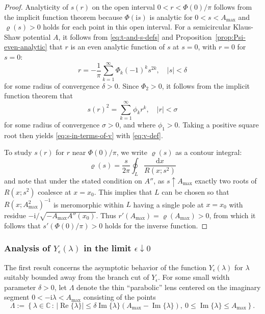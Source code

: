 \documentclass[12pt]{amsart}
\numberwithin{equation}{section}
\newcommand{\dd}{\mathrm{d}}
\newcommand{\ii}{\mathrm{i}}
\newcommand{\SP}{\lambda}
\newcommand{\phaseint}{\Phi}
\newcommand{\evdensity}{\varrho}
\newcommand{\C}{\mathbb{C}}
\newcommand{\rr}{r}
\DeclareMathOperator{\imag}{Im}
\DeclareMathOperator{\re}{Re}
\begin{document}
\begin{proof}
Analyticity of $s(\rr)$ on the open interval $0<\rr<\phaseint(0)/\pi$ follows from the implicit function theorem because $\phaseint(\ii s)$ is analytic for $0<s<A_\mathrm{max}$ and $\evdensity(s)>0$ holds for each point in this open interval.  
For a semicircular Klaus-Shaw potential $A$, it follows from \eqref{eq:t-and-s-defs} and Proposition~\ref{prop:Psi-even-analytic} that 
$\rr$ is an even analytic function of $s$ at $s=0$, with $\rr=0$ for $s=0$:
\begin{equation}
\rr=-\frac{1}{\pi}\sum_{k=1}^\infty \phaseint_{k}(-1)^ks^{2k},\quad |s|<\delta
\end{equation}
for some radius of convergence $\delta>0$.  Since $\phaseint_2>0$, it follows from the implicit function theorem that 
\begin{equation}
s(\rr)^2 = \sum_{k=1}^\infty \phi_k\rr^k,\quad |\rr|<\sigma
\end{equation}
for some radius of convergence $\sigma>0$, and where $\phi_1>0$.  Taking a positive square root then yields \eqref{eq:s-in-terms-of-v} with \eqref{eq:v-def}.

To study $s(\rr)$ for $\rr$ near $\phaseint(0)/\pi$, we
write $\evdensity(s)$ as a contour integral:
\begin{equation}
\evdensity(s)=\frac{s}{2\pi}\oint_L\frac{\dd x}{R(x;s^2)}
\end{equation}
and note that under the stated condition on $A''$, as $s\uparrow A_\mathrm{max}$ exactly two roots of $R(x;s^2)$ coalesce at $x=x_0$.  This implies that $L$ can be chosen so that $R(x;A_\mathrm{max}^2)^{-1}$ is meromorphic within $L$ having a single pole at $x=x_0$ with residue $-\ii/\sqrt{-A_\mathrm{max}A''(x_0)}$.  Thus $\rr'(A_\mathrm{max})=\evdensity(A_\mathrm{max})>0$, from which it follows that $s'(\phaseint(0)/\pi)>0$ holds for the inverse function.
\end{proof}

\subsubsection{Analysis of $Y_\epsilon(\SP)$ in the limit $\epsilon\downarrow 0$}
The first result concerns the asymptotic behavior of the function $Y_\epsilon(\SP)$ for $\SP$ suitably bounded away from the branch cut of $Y_\epsilon$.  For some small width parameter $\delta>0$, let $\Lambda$ denote the thin ``parabolic'' lens centered on the imaginary segment $0<-\ii\SP<A_\mathrm{max}$ consisting of the points
\begin{equation}
	\label{eq:Lambda-def}
	\Lambda:= \left\{ \SP \in \C \,:\,  |\re\{\SP\}| \le \delta\imag\{\SP\}(A_\mathrm{max}-\imag\{\SP\}),\ 0\le \imag\{\SP\}\le A_\mathrm{max}  \right\}.
\end{equation}
\end{document}
